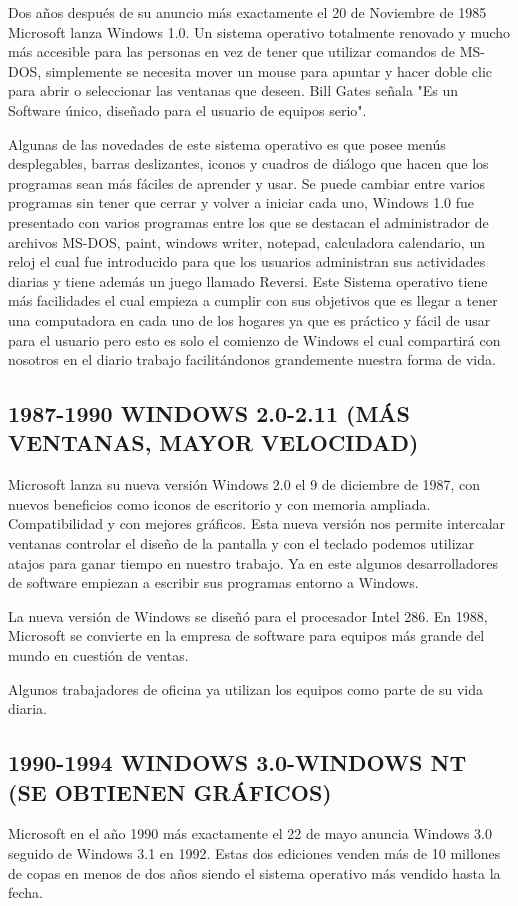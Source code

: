 Dos años después de su anuncio más exactamente el 20 de Noviembre de 1985 Microsoft lanza Windows 1.0. Un sistema operativo totalmente renovado y mucho más accesible para 
las personas en vez de tener que utilizar comandos de MS-DOS, simplemente se  necesita mover un mouse para apuntar y hacer doble clic para abrir o seleccionar las ventanas 
que deseen. Bill Gates señala "Es un Software único, diseñado para el usuario de equipos serio".
 
Algunas de las novedades de este sistema operativo es que posee menús desplegables, barras deslizantes, iconos y cuadros de diálogo que hacen que los programas sean más 
fáciles de aprender y usar. Se puede cambiar entre varios programas sin tener que cerrar y volver a iniciar cada uno, Windows 1.0 fue presentado con varios programas entre 
los que se destacan el administrador de archivos MS-DOS, paint, windows writer, notepad, calculadora calendario, un reloj el cual fue introducido para que los usuarios 
administran sus actividades diarias y tiene además un juego  llamado Reversi. Este Sistema operativo tiene más facilidades el cual empieza a cumplir con sus objetivos que 
es llegar a tener una computadora en cada uno de los hogares ya que es práctico y fácil de usar para el usuario pero esto es solo el comienzo de Windows el cual compartirá 
con nosotros en el diario trabajo facilitándonos grandemente nuestra forma de vida.

\subsection*{1987-1990 WINDOWS 2.0-2.11 (MÁS VENTANAS, MAYOR VELOCIDAD)}
Microsoft lanza su nueva versión Windows 2.0 el 9 de diciembre de 1987, con nuevos beneficios como iconos de escritorio y con memoria ampliada. Compatibilidad y con mejores 
gráficos. Esta nueva versión nos permite intercalar ventanas controlar el diseño de la pantalla y con el teclado podemos utilizar atajos para ganar tiempo en nuestro 
trabajo. Ya en este algunos desarrolladores de software empiezan a escribir sus programas entorno a Windows.
 
La nueva versión de Windows se diseñó para el procesador Intel 286. En 1988, Microsoft se convierte en la empresa de software para equipos más grande del mundo en cuestión 
de ventas.
 
Algunos trabajadores de oficina ya utilizan los equipos como parte de su vida diaria.

\subsection*{1990-1994 WINDOWS 3.0-WINDOWS NT (SE OBTIENEN GRÁFICOS)}
Microsoft en el año 1990 más exactamente el 22 de mayo  anuncia Windows 3.0 seguido de Windows 3.1 en 1992. Estas dos ediciones venden más de 10 millones de copas en menos 
de dos años siendo el sistema operativo más vendido hasta la fecha.
 
